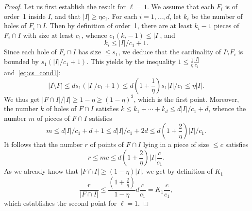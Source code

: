 \documentclass[10pt]{amsart}
\theoremstyle{definition}\newtheorem{defi}[theo]{Definition}\newtheorem{rema}[theo]{Remark}\newtheorem{exam}[theo]{Example}\newtheorem{exem}[theo]{Example}\newtheorem{nota}[theo]{Notation}
\begin{document}
\begin{proof}
Let us first establish the result for $\ell=1$. We assume that each $F_i$ is of order~1 inside $I$, and that $|I|\ge \eta c_1$. For each $i=1,\ldots,d$, let $k_i$ be the number of holes of $F_i\cap I$. Then by definition of order~1, there are at least $k_i-1$ pieces of $F_i\cap I$ with size at least $c_1$, whence $c_1(k_i-1)\le |I|$, and
\[
k_i\le |I|/c_1+1.
\]
Since each hole of $F_i\cap I$ has size $\le s_1$, we deduce that the cardinality of $I\setminus F_i$ is bounded by $s_1(|I|/c_1+1)$. This yields by the inequality $1\le \frac{1}{\eta}\frac{|I|}{c_1}$ and~\eqref{eq:cs_cond1}:
\[
|I\setminus F| \le ds_1(|I|/c_1+1) \le d\left(1+\frac{1}{\eta}\right)s_1|I|/c_1 \le \eta |I|.
\]
We thus get $|F\cap I|/|I| \ge 1-\eta\ge (1-\eta)^{2}$, which is the first point. Moreover, the number $k$ of holes of $F\cap I$ satisfies $k\le k_1+\cdots+k_d\le d|I|/c_1+d$, whence the number $m$ of pieces of $F\cap I$ satisfies
\[
m \le d|I|/c_1+d+1 \le d|I|/c_1+2d \le d\left(1+\frac{2}{\eta}\right)|I|/c_1.
\]
It follows that the number $r$ of points of $F\cap I$ lying in a piece of size $\le c$ satisfies
\[
r\le mc \le d\left(1+\frac{2}{\eta}\right)|I| \frac{c}{c_1}.
\]
As we already know that $|F\cap I|\ge (1-\eta)|I|$, we get by definition of $K_1$
\[
\frac{r}{|F\cap I|} \le \frac{\left(1+\frac{2}{\eta}\right)}{1-\eta} d \frac{c}{c_1} = K_1
\frac{c}{c_1},
\]
which establishes the second point for $\ell=1$.


\end{proof}
\end{document}
